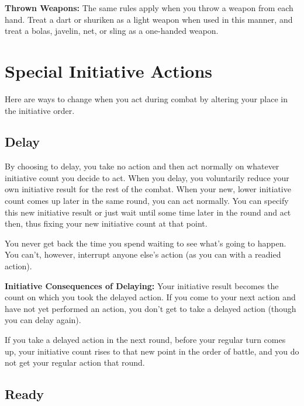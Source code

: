 \textbf{Thrown Weapons:} The same rules apply when you throw a weapon from each 
hand. Treat a dart or shuriken as a light weapon when used in this manner, and 
treat a bolas, javelin, net, or sling as a one-handed weapon.

\section{Special Initiative Actions}

Here are ways to change when you act during combat by altering your place in the 
initiative order.

\subsection{Delay}

By choosing to delay, you take no action and then act normally on whatever initiative 
count you decide to act. When you delay, you voluntarily reduce your own initiative 
result for the rest of the combat. When your new, lower initiative count comes 
up later in the same round, you can act normally. You can specify this new initiative 
result or just wait until some time later in the round and act then, thus fixing 
your new initiative count at that point.

You never get back the time you spend waiting to see what's going to happen. You 
can't, however, interrupt anyone else's action (as you can with a readied action).

\textbf{Initiative Consequences of Delaying:} Your initiative result becomes the 
count on which you took the delayed action. If you come to your next action and 
have not yet performed an action, you don't get to take a delayed action (though 
you can delay again).

If you take a delayed action in the next round, before your regular turn comes 
up, your initiative count rises to that new point in the order of battle, and you 
do not get your regular action that round.

\subsection{Ready}

